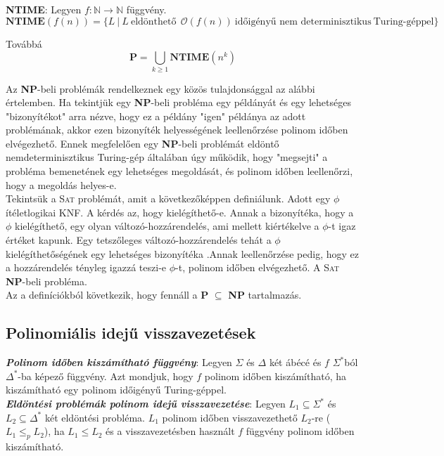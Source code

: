 \documentclass[tikz,12pt,margin=0px]{article}
\begin{document}
    \noindent \textbf{NTIME}: Legyen $f : \mathbb{N} \to \mathbb{N}$ függvény.
    \[
        \textbf{NTIME}(f(n)) = \Big\{L \ | \ L \ \text{eldönthető}\ \ \mathcal{O}(f(n)) \ \text{időigényű nem determinisztikus} \ \text{Turing-géppel} \Big\}
    \]

    \noindent Továbbá
    \[
        \textbf{P} =\bigcup\limits_{k \geq 1} \textbf{NTIME}(n^{k})
    \]
		
    \noindent Az \textbf{NP}-beli problémák rendelkeznek egy közös tulajdonsággal az alábbi értelemben. Ha tekintjük egy \textbf{NP}-beli probléma egy példányát és egy lehetséges "bizonyítékot" arra nézve, hogy ez a példány "igen" példánya az adott problémának, akkor ezen bizonyíték helyességének leellenőrzése polinom időben elvégezhető. Ennek megfelelően egy \textbf{NP}-beli problémát eldöntő nemdeterminisztikus Turing-gép általában úgy működik, hogy "megsejti" a probléma bemenetének egy lehetséges megoldását, és polinom időben leellenőrzi, hogy a megoldás helyes-e.\\

    \noindent Tekintsük a \textsc{Sat} problémát, amit a következőképpen definiálunk. Adott egy $\phi$ ítéletlogikai KNF. A kérdés az, hogy kielégíthető-e. Annak a bizonyítéka, hogy	a $\phi$ kielégíthető, egy olyan változó-hozzárendelés, ami mellett kiértékelve a $\phi$-t igaz értéket kapunk. Egy tetszőleges változó-hozzárendelés tehát a $\phi$ kielégíthetőségének egy lehetséges bizonyítéka .Annak leellenőrzése pedig, hogy ez a hozzárendelés tényleg igazzá teszi-e $\phi$-t, polinom időben elvégezhető. A \textsc{Sat}
	\textbf{NP}-beli probléma.\\
	
	\noindent Az a definíciókból következik, hogy fennáll a \textbf{P} $\subseteq$ \textbf{NP} tartalmazás.

    \subsection*{Polinomiális idejű visszavezetések\\}

	\noindent \textbf{\emph{Polinom időben kiszámítható függvény}}: Legyen $\Sigma$ és $\Delta$ két ábécé és $f$ $\Sigma^{*}$ból
	$\Delta^{*}$-ba képező függvény. Azt mondjuk, hogy $f$ polinom időben kiszámítható, ha kiszámítható egy polinom
	időigényű Turing-géppel.\\
	
	\noindent \textbf{\emph{Eldöntési problémák polinom idejű visszavezetése}}:
	Legyen $L_{1} \subseteq \Sigma^{*}$ és $L_{2} \subseteq \Delta^{*}$	két eldöntési probléma.
	$L_{1}$ polinom időben visszavezethető $L_{2}$-re ($L_{1} \leq_{p} L_{2}$), ha $L_{1} \leq L_{2}$ és
	a visszavezetésben használt $f$ függvény polinom időben kiszámítható.\\
	
\end{document}
